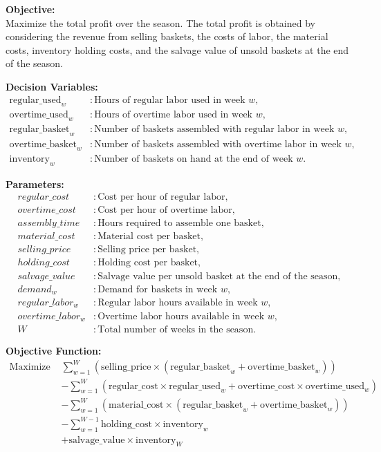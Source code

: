 \documentclass{article}
\begin{document}
\textbf{Objective:}\\
Maximize the total profit over the season. The total profit is obtained by considering the revenue from selling baskets, the costs of labor, the material costs, inventory holding costs, and the salvage value of unsold baskets at the end of the season.

\textbf{Decision Variables:}
\begin{align*}
\text{regular\_used}_{w} & : \text{Hours of regular labor used in week } w, \\
\text{overtime\_used}_{w} & : \text{Hours of overtime labor used in week } w, \\
\text{regular\_basket}_{w} & : \text{Number of baskets assembled with regular labor in week } w, \\
\text{overtime\_basket}_{w} & : \text{Number of baskets assembled with overtime labor in week } w, \\
\text{inventory}_{w} & : \text{Number of baskets on hand at the end of week } w.
\end{align*}

\textbf{Parameters:}
\begin{align*}
regular\_cost & : \text{Cost per hour of regular labor}, \\
overtime\_cost & : \text{Cost per hour of overtime labor}, \\
assembly\_time & : \text{Hours required to assemble one basket}, \\
material\_cost & : \text{Material cost per basket}, \\
selling\_price & : \text{Selling price per basket}, \\
holding\_cost & : \text{Holding cost per basket}, \\
salvage\_value & : \text{Salvage value per unsold basket at the end of the season}, \\
demand_{w} & : \text{Demand for baskets in week } w, \\
regular\_labor_{w} & : \text{Regular labor hours available in week } w, \\
overtime\_labor_{w} & : \text{Overtime labor hours available in week } w, \\
W & : \text{Total number of weeks in the season}.
\end{align*}

\textbf{Objective Function:}
\begin{align*}
\text{Maximize } & \sum_{w=1}^{W} \left( \text{selling\_price} \times (\text{regular\_basket}_{w} + \text{overtime\_basket}_{w}) \right) \\
& - \sum_{w=1}^{W} \left( \text{regular\_cost} \times \text{regular\_used}_{w} + \text{overtime\_cost} \times \text{overtime\_used}_{w} \right) \\
& - \sum_{w=1}^{W} \left( \text{material\_cost} \times (\text{regular\_basket}_{w} + \text{overtime\_basket}_{w}) \right) \\
& - \sum_{w=1}^{W-1} \text{holding\_cost} \times \text{inventory}_{w} \\
& + \text{salvage\_value} \times \text{inventory}_{W}
\end{align*}
\end{document}
